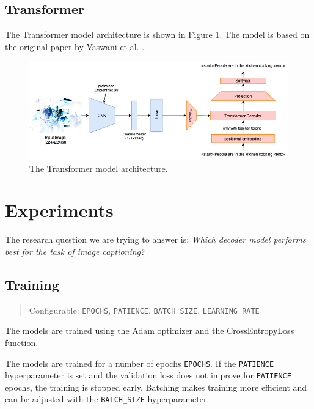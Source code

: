 \documentclass[12pt]{article}
\theoremstyle{plain}
\theoremstyle{definition}
\theoremstyle{remark}
\begin{document}
\subsection{Transformer}\label{sec:transformer}
The Transformer model architecture is shown in Figure \ref{fig:transformer}. The model is based on the original paper by Vaswani et al. \cite{vaswani2017attention}.
\begin{figure}[H]
    \centering
    \includegraphics[width=.9\textwidth]{res/transformer.png}
    \caption{The Transformer model architecture.}\label{fig:transformer}
\end{figure}



\section{Experiments}\label{sec:experiments}
The research question we are trying to answer is: \textit{Which decoder model performs best for the task of image captioning?}

\subsection{Training}\label{sec:training}
\begin{quote}\center Configurable: \texttt{EPOCHS}, \texttt{PATIENCE}, \texttt{BATCH\_SIZE}, \texttt{LEARNING\_RATE}\end{quote}
\par The models are trained using the Adam optimizer and the CrossEntropyLoss function.
\par The models are trained for a number of epochs \texttt{EPOCHS}. If the \texttt{PATIENCE} hyperparameter is set and the validation loss does not improve for \texttt{PATIENCE} epochs, the training is stopped early. Batching makes training more efficient and can be adjusted with the \texttt{BATCH\_SIZE} hyperparameter.
\end{document}
